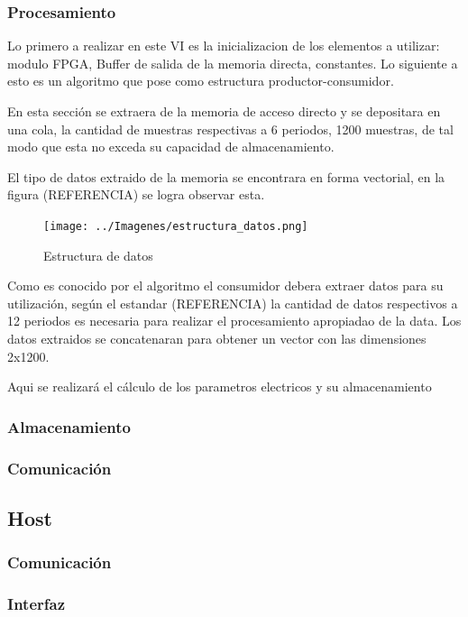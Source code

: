     \subsubsection{Procesamiento}
      \par Lo primero a realizar en este VI es la inicializacion de los elementos a utilizar: modulo FPGA, Buffer de salida de la memoria directa, constantes. Lo siguiente a esto es un algoritmo que pose como estructura productor-consumidor.
        \par En esta sección se extraera de la memoria de acceso directo y se depositara en una cola, la cantidad de muestras respectivas a 6 periodos, 1200 muestras, de tal modo que esta no exceda su capacidad de almacenamiento.

        \par El tipo de datos extraido de la memoria se encontrara en forma vectorial, en la figura (REFERENCIA) se logra observar esta.
        \begin{figure}[H]
            \centering
            \texttt{[image: ../Imagenes/estructura\_datos.png]}
            \caption{Estructura de datos}
            \label{fig:Est_dat}
        \end{figure}

        \par Como es conocido por el algoritmo el consumidor debera extraer datos para su utilización, según el estandar (REFERENCIA) la cantidad de datos respectivos a 12 periodos es necesaria para realizar el procesamiento apropiadao de la data. Los datos extraidos se concatenaran para obtener un vector con las dimensiones 2x1200.

        \par Aqui se realizará el cálculo de los parametros electricos y su almacenamiento



    \subsubsection{Almacenamiento}
    \subsubsection{Comunicación}
  \subsection{Host}
    \subsubsection{Comunicación}
    \subsubsection{Interfaz}
